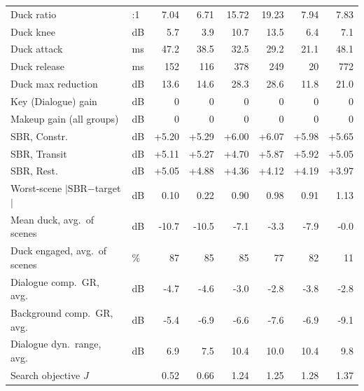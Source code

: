 \documentclass[11pt]{article}
\begin{document}
\begin{table}[H]
\begin{tabular}{@{}l l rrrrrr@{}}
Duck ratio & :1 & 7.04 & 6.71 & 15.72 & 19.23 & 7.94 & 7.83 \\
Duck knee & dB & 5.7 & 3.9 & 10.7 & 13.5 & 6.4 & 7.1 \\
Duck attack & ms & 47.2 & 38.5 & 32.5 & 29.2 & 21.1 & 48.1 \\
Duck release & ms & 152 & 116 & 378 & 249 & 20 & 772 \\
Duck max reduction & dB & 13.6 & 14.6 & 28.3 & 28.6 & 11.8 & 21.0 \\
Key (Dialogue) gain & dB & 0 & 0 & 0 & 0 & 0 & 0 \\
Makeup gain (all groups) & dB & 0 & 0 & 0 & 0 & 0 & 0 \\
\midrule
SBR, Constr. & dB & +5.20 & +5.29 & +6.00 & +6.07 & +5.98 & +5.65 \\
SBR, Transit & dB & +5.11 & +5.27 & +4.70 & +5.87 & +5.92 & +5.05 \\
SBR, Rest. & dB & +5.05 & +4.88 & +4.36 & +4.12 & +4.19 & +3.97 \\
Worst-scene $|$SBR$-$target$|$ & dB & 0.10 & 0.22 & 0.90 & 0.98 & 0.91 & 1.13 \\
Mean duck, avg.\ of scenes & dB & -10.7 & -10.5 & -7.1 & -3.3 & -7.9 & -0.0 \\
Duck engaged, avg.\ of scenes & \% & 87 & 85 & 85 & 77 & 82 & 11 \\
Dialogue comp.\ GR, avg.\ & dB & -4.7 & -4.6 & -3.0 & -2.8 & -3.8 & -2.8 \\
Background comp.\ GR, avg.\ & dB & -5.4 & -6.9 & -6.6 & -7.6 & -6.9 & -9.1 \\
Dialogue dyn.\ range, avg.\ & dB & 6.9 & 7.5 & 10.4 & 10.0 & 10.4 & 9.8 \\
Search objective $J$ & & 0.52 & 0.66 & 1.24 & 1.25 & 1.28 & 1.37 \\
\bottomrule
\end{tabular}
\end{table}
\end{document}
